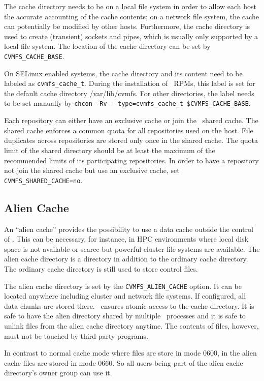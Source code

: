 The cache directory needs to be on a local file system in order to allow each host the accurate accounting of the cache contents; on a network file system, the cache can potentially be modified by other hosts.
Furthermore, the cache directory is used to create (transient) sockets and pipes, which is usually only supported by a local file system.
The location of the cache directory can be set by \texttt{CVMFS\_CACHE\_BASE}.

On SELinux enabled systems, the cache directory and its content need to be labeled as \texttt{cvmfs\_cache\_t}.
During the installation of \cvmfs\ RPMs, this label is set for the default cache directory /var/lib/cvmfs.
For other directories, the label needs to be set manually by \texttt{chcon~-Rv~-{}-type=cvmfs\_cache\_t~\$CVMFS\_CACHE\_BASE}.

Each repository can either have an exclusive cache or join the \cvmfs\ shared cache.
The shared cache enforces a common quota for all repositories used on the host.
File duplicates across repositories are stored only once in the shared cache.
The quota limit of the shared directory should be at least the maximum of the recommended limits of its participating repositories.
In order to have a repository not join the shared cache but use an exclusive cache, set \texttt{CVMFS\_SHARED\_CACHE=no}.

\subsection{Alien Cache}
An ``alien cache'' provides the possibility to use a data cache outside the control of \cvmfs.
This can be necessary, for instance, in HPC environments where local disk space is not available or scarce but powerful cluster file systems are available.
The alien cache directory is a directory in addition to the ordinary cache directory.
The ordinary cache directory is still used to store control files.

The alien cache directory is set by the \texttt{CVMFS\_ALIEN\_CACHE} option.
It can be located anywhere including cluster and network file systems.
If configured, all data chunks are stored there.
\cvmfs\ ensures atomic access to the cache directory.
It is safe to have the alien directory shared by multiple \cvmfs\ processes and it is safe to unlink files from the alien cache directory anytime.
The contents of files, however, must not be touched by third-party programs.

In contrast to normal cache mode where files are store in mode 0600, in the alien cache files are stored in mode 0660.  
So all users being part of the alien cache directory's owner group can use it.

